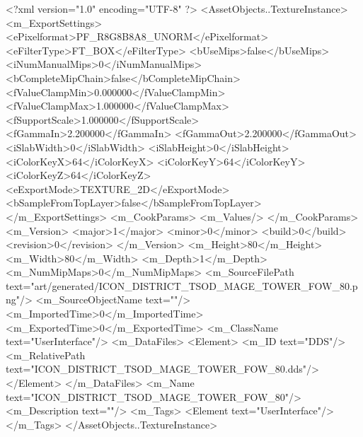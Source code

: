 <?xml version="1.0" encoding="UTF-8" ?>
<AssetObjects..TextureInstance>
	<m_ExportSettings>
		<ePixelformat>PF_R8G8B8A8_UNORM</ePixelformat>
		<eFilterType>FT_BOX</eFilterType>
		<bUseMips>false</bUseMips>
		<iNumManualMips>0</iNumManualMips>
		<bCompleteMipChain>false</bCompleteMipChain>
		<fValueClampMin>0.000000</fValueClampMin>
		<fValueClampMax>1.000000</fValueClampMax>
		<fSupportScale>1.000000</fSupportScale>
		<fGammaIn>2.200000</fGammaIn>
		<fGammaOut>2.200000</fGammaOut>
		<iSlabWidth>0</iSlabWidth>
		<iSlabHeight>0</iSlabHeight>
		<iColorKeyX>64</iColorKeyX>
		<iColorKeyY>64</iColorKeyY>
		<iColorKeyZ>64</iColorKeyZ>
		<eExportMode>TEXTURE_2D</eExportMode>
		<bSampleFromTopLayer>false</bSampleFromTopLayer>
	</m_ExportSettings>
	<m_CookParams>
		<m_Values/>
	</m_CookParams>
	<m_Version>
		<major>1</major>
		<minor>0</minor>
		<build>0</build>
		<revision>0</revision>
	</m_Version>
	<m_Height>80</m_Height>
	<m_Width>80</m_Width>
	<m_Depth>1</m_Depth>
	<m_NumMipMaps>0</m_NumMipMaps>
	<m_SourceFilePath text="art/generated/ICON_DISTRICT_TSOD_MAGE_TOWER_FOW_80.png"/>
	<m_SourceObjectName text=""/>
	<m_ImportedTime>0</m_ImportedTime>
	<m_ExportedTime>0</m_ExportedTime>
	<m_ClassName text="UserInterface"/>
	<m_DataFiles>
		<Element>
			<m_ID text="DDS"/>
			<m_RelativePath text="ICON_DISTRICT_TSOD_MAGE_TOWER_FOW_80.dds"/>
		</Element>
	</m_DataFiles>
	<m_Name text="ICON_DISTRICT_TSOD_MAGE_TOWER_FOW_80"/>
	<m_Description text=""/>
	<m_Tags>
		<Element text="UserInterface"/>
	</m_Tags>
</AssetObjects..TextureInstance>
